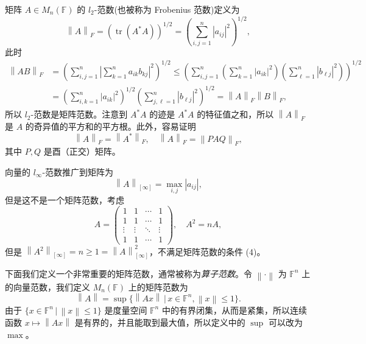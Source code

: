 \documentclass[fontset=none,zihao=-4]{Notes}
\DeclareMathOperator\tr{tr}
\newcommand{\norm}[1]{\left\lVert#1\right\rVert}
\begin{document}
\begin{example}
  矩阵 $A\in M_n(\mathbb{F})$ 的 $l_2$-范数(也被称为 Frobenius 范数)定义为
  \[
    \norm{A}_{F}=\left(\tr (A^*A)\right)^{1/2}=\left(\sum_{i,j=1}^n|a_{ij}|^2\right)^{1/2},  
  \]
  此时
  \begin{align*}
    \norm{AB}_F&=\left(\sum_{i,j=1}^n\left|\sum_{k=1}^n a_{ik}b_{kj}\right|^2\right)^{1/2}
    \leq \left(\sum_{i,j=1}^n\left(\sum_{k=1}^n|a_{ik}|^2\right)\left(\sum_{\ell=1}^n|b_{\ell j}|^2\right)\right)^{1/2}\\
    &=\left(\sum_{i,k=1}^n|a_{ik}|^2\right)^{1/2}\left(\sum_{j,\ell=1}^n|b_{\ell j}|^2\right)^{1/2}
    =\norm{A}_F\norm{B}_F,
  \end{align*}
  所以 $l_2$-范数是矩阵范数。注意到 $A^*A$ 的迹是 $A^*A$ 的特征值之和，所以 $\norm{A}_F$
  是 $A$ 的奇异值的平方和的平方根。此外，容易证明
  \[
    \norm{A}_F=\norm{A^*}_F,\quad \norm{A}_F=\norm{PAQ}_F,  
  \]
  其中 $P,Q$ 是酉（正交）矩阵。
\end{example}

\begin{example}
  向量的 $l_\infty$-范数推广到矩阵为
  \[
    \norm{A}_{[\infty]}=\max_{i,j}|a_{ij}|,  
  \]
  但是这不是一个矩阵范数，考虑
  \[
    A=\begin{pmatrix}
      1 & 1 & \cdots & 1\\
      1 & 1 & \cdots & 1\\
      \vdots & \vdots & \ddots & \vdots \\
      1 & 1 & \cdots & 1
    \end{pmatrix}  ,\quad A^2=nA,
  \]
  但是 $\norm{A^2}_{[\infty]}=n\geq 1=\norm{A}_{[\infty]}^2$，不满足矩阵范数的条件 (4)。
\end{example}

下面我们定义一个非常重要的矩阵范数，通常被称为\emph{算子范数}。令 $\norm{\cdot}$
为 $\mathbb{F}^n$ 上的向量范数，我们定义 $M_n(\mathbb{F})$ 上的矩阵范数为
\[
  \norm{A}=\sup\bigl\{\norm{Ax}\,|\, x\in \mathbb{F}^n,\norm{x}\leq 1\bigr\}.  
\]
由于 $\{x\in\mathbb{F}^n\,|\, \norm{x}\leq 1\}$
是度量空间 $\mathbb{F}^n$ 中的有界闭集，从而是紧集，所以连续函数 $x\mapsto \norm{Ax}$
是有界的，并且能取到最大值，所以定义中的 $\sup$ 可以改为 $\max$。
\end{document}
